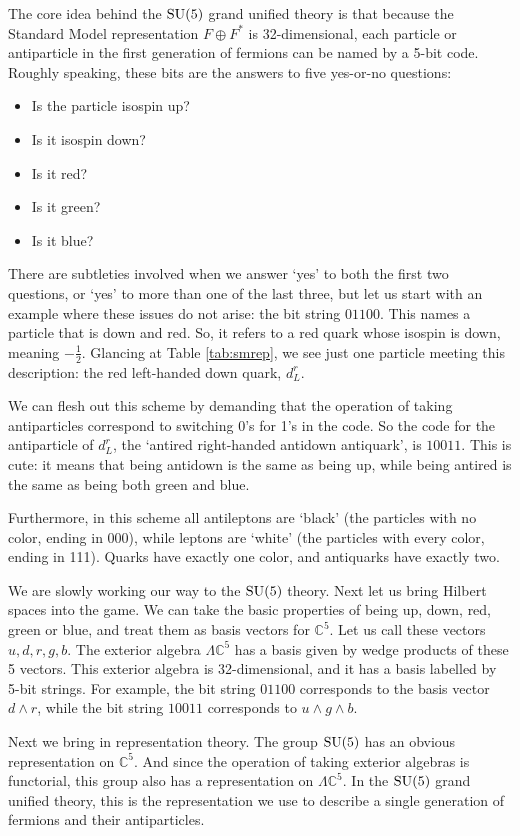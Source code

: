 \documentclass[12pt]{article}
\newcommand{\C}{{\mathbb C}}  %
\newcommand{\SU}{{\rm SU}}    %
\newcommand{\half}{\frac{1}{2}} %
\begin{document}
The core idea behind the $\SU(5)$ grand unified theory is that because
the Standard Model representation $F \oplus F^*$ is 32-dimensional,
each particle or antiparticle in the first generation of fermions can
be named by a 5-bit code.  Roughly speaking, these bits are the answers 
to five yes-or-no questions:
\begin{itemize}
\item Is the particle isospin up?
\item Is it isospin down?
\item Is it red?
\item Is it green?
\item Is it blue?
\end{itemize}
There are subtleties involved when we answer `yes' to both the
first two questions, or `yes' to more than one of the last three, but
let us start with an example where these issues do not arise:
the bit string $01100$.  This names a particle that is down and red.
So, it refers to a red quark whose isospin is down, meaning $-\half$.
Glancing at Table \ref{tab:smrep}, we see just one particle meeting
this description: the red left-handed down quark, $d^r_L$.

We can flesh out this scheme by demanding that the operation of taking
antiparticles correspond to switching 0's for 1's in the code.  So the
code for the antiparticle of $d^r_L$, the `antired right-handed
antidown antiquark', is $10011$.  This is cute: it means that being
antidown is the same as being up, while being antired is the same as
being both green and blue.

Furthermore, in this scheme all antileptons are `black' (the particles
with no color, ending in 000), while leptons are `white' (the particles
with every color, ending in 111).  Quarks have exactly one color, and
antiquarks have exactly two.

We are slowly working our way to the $\SU(5)$ theory.  Next let us bring
Hilbert spaces into the game.  We can take the basic properties of
being up, down, red, green or blue, and treat them as basis vectors for
$\C^5$.  Let us call these vectors $u,d,r,g,b$.  The exterior algebra
$\Lambda \C^5$ has a basis given by wedge products of these 5 vectors.
This exterior algebra is 32-dimensional, and it has a basis labelled by
5-bit strings.  For example, the bit string $01100$ corresponds to the
basis vector $d \wedge r$, while the bit string $10011$ corresponds to
$u \wedge g \wedge b$.

Next we bring in representation theory.  The group $\SU(5)$ has an
obvious representation on $\C^5$.  And since the operation of taking
exterior algebras is functorial, this group also has a representation
on $\Lambda \C^5$.  In the $\SU(5)$ grand unified theory, this is the
representation we use to describe a single generation of fermions and
their antiparticles.
\end{document}
